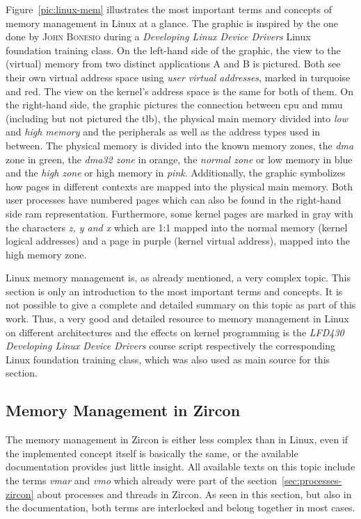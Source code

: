 Figure~\ref{pic:linux-mem} illustrates the most important terms and concepts of memory management in Linux at a glance.
The graphic is inspired by the one done by \textsc{John Bonesio} during a \textit{Developing Linux Device Drivers} Linux foundation training class.
On the left-hand side of the graphic, the view to the (virtual) memory from two distinct applications A and B is pictured.
Both see their own virtual address space using \textit{user virtual addresses}, marked in turquoise and red.
The view on the kernel's address space is the same for both of them.
On the right-hand side, the graphic pictures the connection between \ac{cpu} and \ac{mmu} (including but not pictured the \ac{tlb}),  the physical main memory divided into \textit{low} and \textit{high memory} and the peripherals as well as the address types used in between.
The physical memory is divided into the known memory zones, the \textit{\ac{dma}} zone in green, the \textit{\ac{dma}32 zone} in orange, the \textit{normal zone} or low memory in blue and the \textit{high zone} or high memory in \textit{pink}.
Additionally, the graphic symbolizes how pages in different contexts are mapped into the physical main memory.
Both user processes have numbered pages which can also be found in the right-hand side \ac{ram} representation.
Furthermore, some kernel pages are marked in gray with the characters \textit{z, y and x} which are 1:1 mapped into the normal memory (kernel logical addresses) and a page in purple (kernel virtual address), mapped into the high memory zone. 

Linux memory management is, as already mentioned, a very complex topic.
This section is only an introduction to the most important terms and concepts.
It is not possible to give a complete and detailed summary on this topic as part of this work.
Thus, a very good and detailed resource to memory management in Linux on different architectures and the effects on kernel programming is the \textit{LFD430 Developing Linux Device Drivers} course script\cite{lfd430} respectively the corresponding Linux foundation training class, which was also used as main source for this section. 
%

\subsection{Memory Management in Zircon} 
The memory management in Zircon is either less complex than in Linux, even if the implemented concept itself is basically the same, or the available documentation provides just little insight.
All available texts on this topic include the terms \textit{\acf{vmar}} and \textit{\acf{vmo}} which already were part of the section~\ref{sec:processes-zircon} about processes and threads in Zircon.
As seen in this section, but also in the documentation, both terms are interlocked and belong together in most cases.

